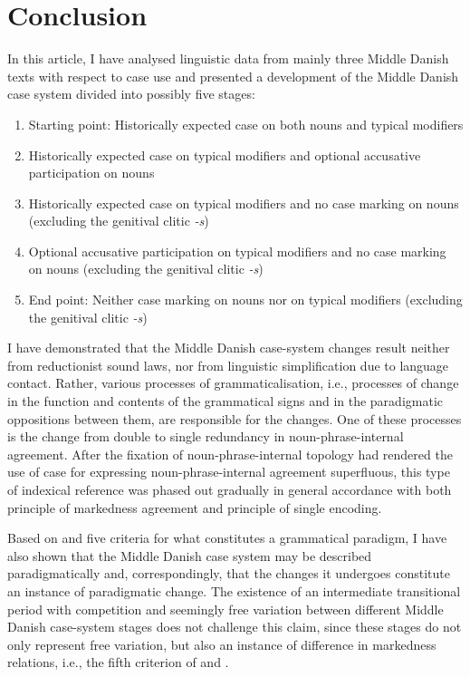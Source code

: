 \documentclass[output=paper]{langsci/langscibook}
\begin{document}
\section{Conclusion} \label{hansen:5}

In this article, I have analysed linguistic data from mainly three Middle Danish texts with respect to case use and presented a development of the Middle Danish case system divided into possibly five stages:

\begin{enumerate}
\item  Starting point: Historically expected case on both nouns and typical modifiers
\item  Historically expected case on typical modifiers and optional accusative participation on nouns
\item Historically expected case on typical modifiers and no case marking on nouns (excluding the genitival clitic \textit{{}-s})
\item Optional accusative participation on typical modifiers and no case marking on nouns (excluding the genitival clitic \textit{{}-s})
\item End point: Neither case marking on nouns nor on typical modifiers (excluding the genitival clitic \textit{{}-s})
\end{enumerate}

I have demonstrated that the Middle Danish case-system changes result neither from reductionist sound laws, nor from linguistic simplification due to language contact. Rather, various processes of grammaticalisation, i.e., processes of change in the function and contents of the grammatical signs and in the paradigmatic oppositions between them, are responsible for the changes. One of these processes is the change from double to single redundancy in noun-phrase-internal agreement. After the fixation of noun-phrase-internal topology had rendered the use of case for expressing noun-phrase-internal agreement superfluous, this type of indexical reference was phased out gradually in general accordance with both  principle of markedness agreement and  principle of single encoding.

Based on \citet[5--6]{Nørgård-Sørensen2011} and \citet[262--263]{Nørgård-Sørensen2015} five criteria for what constitutes a grammatical paradigm, I have also shown that the Middle Danish case system may be described paradigmatically and, correspondingly, that the changes it undergoes constitute an instance of paradigmatic change. The existence of an intermediate transitional period with competition and seemingly free variation between different Middle Danish case-system stages does not challenge this claim, since these stages do not only represent free variation, but also an instance of difference in markedness relations, i.e., the fifth criterion of \citet[6]{Nørgård-Sørensen2011} and \citet[263]{Nørgård-Sørensen2015}.
\end{document}
